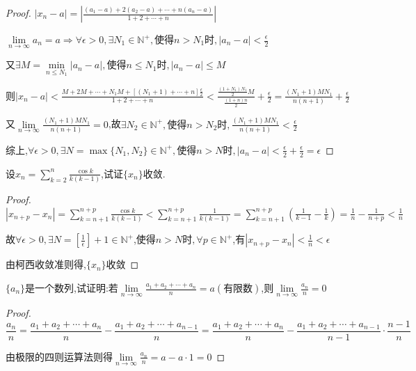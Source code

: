 \begin{proof}
    $|x_n-a|=|\frac{(a_1-a)+2(a_2-a)+\cdots+n(a_n-a)}{1+2+\cdots+n}|$

    $\lim \limits_{n \to \infty} a_n=a \Longrightarrow \forall \epsilon>0,\exists N_1\in \mathbb{N}^+,\mbox{使得}n>N_1\mbox{时},|a_n-a|<\frac{\epsilon}{2}$

    又$\exists M= \underset{n\le N_1}{\min} |a_n-a| ,\mbox{使得}n\le N_1\mbox{时},|a_n-a|\le M$

    则$|x_n-a|<\frac{M+2M+\cdots+N_1M+[(N_1+1)+\cdots+n]\frac{\epsilon}{2}}{1+2+\cdots+n}
        <\frac{\frac{(1+N_1)N_1}{2}M}{\frac{(1+n)n}{2}}+\frac{\epsilon}{2}
        =\frac{(N_1+1)MN_1}{n(n+1)}+\frac{\epsilon}{2}$

    又$\lim \limits_{n \to \infty} \frac{(N_1+1)MN_1}{n(n+1)}=0$,故$\exists N_2 \in \mathbb{N}^+,\mbox{使得}n>N_2\mbox{时},\frac{(N_1+1)MN_1}{n(n+1)}<\frac{\epsilon}{2}$

    综上,$\forall \epsilon>0,\exists N=\max \{ N_1,N_2\}\in \mathbb{N}^+,\mbox{使得}n>N\mbox{时},|a_n-a|<\frac{\epsilon}{2}+\frac{\epsilon}{2}=\epsilon$
\end{proof}

\clearpage

\begin{exercise}
    设$x_n=\sum\limits_{k=2}^{n} \frac{\cos k}{k(k-1)}$,试证$\{x_n\}$收敛.
\end{exercise}

\begin{proof}

    $|x_{n+p}-x_n|=\sum\limits_{k=n+1}^{n+p} \frac{\cos k}{k(k-1)}
    <\sum\limits_{k=n+1}^{n+p} \frac{1}{k(k-1)}
    =\sum\limits_{k=n+1}^{n+p} (\frac{1}{k-1}-\frac{1}{k})=\frac{1}{n}-\frac{1}{n+p}
    <\frac{1}{n}$

    故$\forall \epsilon>0,\exists N=[\frac{1}{\epsilon}]+1\in \mathbb{N}^+$,使得$n>N\mbox{时},\forall p\in \mathbb{N}^+$,有$|x_{n+p}-x_n|<\frac{1}{n}<\epsilon$

    由柯西收敛准则得,$\{x_n\}$收敛
\end{proof}

\begin{exercise}
    $\{a_n\}$是一个数列,试证明:若$\lim \limits_{n \to \infty} \frac{a_1+a_2+\cdots+a_n}{n}=a(\mbox{有限数})$,则$\lim \limits_{n \to \infty} \frac{a_n}{n}=0$
\end{exercise}

\begin{proof}
    $$\frac{a_n}{n}=\frac{a_1+a_2+\cdots+a_n}{n}-\frac{a_1+a_2+\cdots+a_{n-1}}{n}
    =\frac{a_1+a_2+\cdots+a_n}{n}-\frac{a_1+a_2+\cdots+a_{n-1}}{n-1}\cdot \frac{n-1}{n}$$

    由极限的四则运算法则得$\lim \limits_{n \to \infty} \frac{a_n}{n}=a-a\cdot 1=0$
\end{proof}

